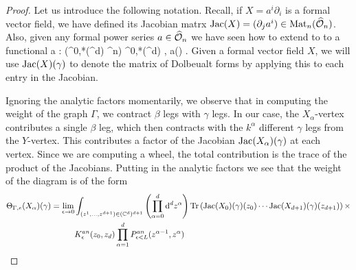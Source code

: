 \begin{proof}

Let us introduce the following notation. 
Recall, if $X = a^i \partial_i$ is a formal vector field, we have defined its Jacobian matrx ${\rm Jac}(X) = (\partial_j a^i) \in {\rm Mat}_n(\widehat{\mathcal O}_n)$.
Also, given any formal power series $a \in \widehat{\mathcal O}_n$ we have seen how to extend to to a functional
\ben
a : \Sym(\Omega^{0,*}(\CC^d) \tensor \CC^n) \to \Omega^{0,*}(\CC^d) \;\; , \;\; \gamma \mapsto a(\gamma) .
\een
Given a formal vector field $X$, we will use ${\rm Jac}(X)(\gamma)$ to denote the matrix of Dolbeualt forms by applying this to each entry in the Jacobian.

Ignoring the analytic factors momentarily, 
we observe that in computing the weight of the graph $\Gamma$,
we contract $\beta$ legs with $\gamma$ legs.
In our case, the $X_\alpha$-vertex contributes a single $\beta$ leg,
which then contracts with the $k^\alpha$ different $\gamma$ legs from the $Y$-vertex.
This contributes a factor of the Jacobian ${\rm Jac}(X_\alpha)(\gamma)$ at each vertex.
Since we are computing a wheel, the total contribution is the trace of the product of the Jacobians. 
Putting in the analytic factors we see that the weight of the diagram is of the form
\begin{align*}
\Theta_{\Gamma,e}(X_\alpha) (\gamma) = \lim_{\epsilon \to 0} & \int_{(z^1,\ldots, z^{d+1}) \in (\mathbb C^d)^{d+1}} \left(\prod_{\alpha=0}^d {\rm d}^d z^\alpha\right) {\rm Tr}\left({\rm Jac}(X_0) (\gamma)(z_0) \cdots {\rm Jac}(X_{d+1})(\gamma)(z_{d+1})\right) \times \\
&  K^{an}_\epsilon(z_0,z_d) \prod_{\alpha = 1}^{d} P_{\epsilon < L}^{an}(z^{\alpha-1}, z^{\alpha}) 
\end{align*}


\end{proof}

